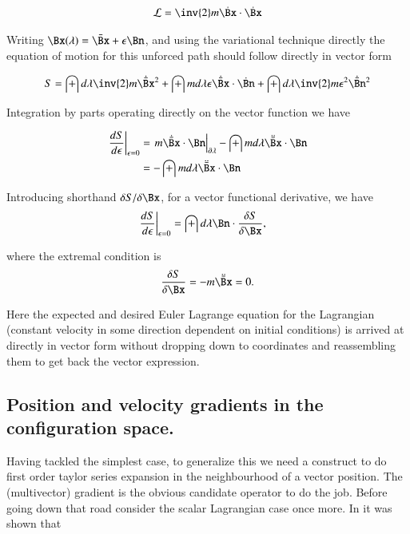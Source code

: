 \documentclass{article}
\newcommand{\LL}[0]{\mathcal{L}}
\begin{document}
\begin{align*}
\LL = \inv{2}m \dot{\Bx} \cdot \dot{\Bx}
\end{align*}

Writing $\Bx(\lambda) = \bar{\Bx} + \epsilon \Bn$, and using the variational technique directly the equation of motion for this unforced path should follow directly
in vector form

\begin{align*}
S = \int d\lambda \inv{2} m \dot{\bar{\Bx}}^2 + \int m d\lambda \epsilon \dot{\bar{\Bx}} \cdot \dot{\Bn} + \int d\lambda \inv{2} m \epsilon^2 \dot{\bar{\Bn}}^2
\end{align*}

Integration by parts operating directly on the vector function we have

\begin{align*}
\left.\frac{d S}{d\epsilon}\right\vert_{\epsilon=0} 
&= \left.{m \dot{\bar{\Bx}} \cdot {\Bn}}\right\vert_{\partial \lambda} - \int m d\lambda \ddot{\bar{\Bx}} \cdot {\Bn} \\
&= - \int m d\lambda \ddot{\bar{\Bx}} \cdot {\Bn} \\
\end{align*}

Introducing shorthand $\delta S/\delta \Bx$, for a vector functional derivative, we have
\begin{align*}
\left.\frac{d S}{d\epsilon}\right\vert_{\epsilon=0} &= \int d\lambda \Bn \cdot \frac{\delta S}{\delta \Bx},
\end{align*}

where the extremal condition is
\begin{align*}
\frac{\delta S}{\delta \Bx} = - m \ddot{\bar{\Bx}} = 0.
\end{align*}

Here the expected and desired Euler Lagrange equation for the Lagrangian (constant velocity in some direction dependent on initial conditions) is arrived at directly in vector form without dropping down to coordinates and reassembling them to get back the vector expression.

\subsection{ Position and velocity gradients in the configuration space. }

Having tackled the simplest case, to generalize this we need a construct to do first order taylor series expansion in the neighbourhood of a vector
position.  The (multivector) gradient is the obvious candidate operator to do the job.  Before going down that road consider the scalar Lagrangian
case once more.  In \cite{PJGradientRecip} it was shown that 

\end{document}
